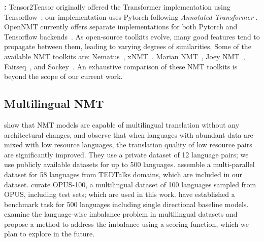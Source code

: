 \textbf{\rtg:}
Tensor2Tensor \cite{vaswani-etal-2018-tensor2tensor} originally offered the Transformer \cite{vaswani2017attention} implementation using Tensorflow~\cite{tensorflow2015-whitepaper}; 
our implementation uses Pytorch \cite{NEURIPS2019_Pytorch} following \textit{Annotated Transformer} \cite{rush-2018-annotated}.
OpenNMT currently offers separate implementations for both Pytorch and Tensorflow backends~\cite{klein-etal-2017-opennmt,klein-etal-2020-opennmt}.
As open-source toolkits evolve, many good features tend to propagate between them, leading to varying degrees of similarities. Some of the available NMT toolkits are:
Nematus~\cite{sennrich-etal-2017-nematus}, 
xNMT~\cite{neubig-etal-2018-xnmt}.
Marian NMT~\cite{junczys-dowmunt-etal-2018-marian-fast},
Joey NMT~\cite{kreutzer-etal-2019-joeynmt},
Fairseq~\cite{ott-etal-2019-fairseq}, and 
Sockey~\cite{hieber-etal-2020-sockeye}.
An exhaustive comparison of these NMT toolkits is beyond the scope of our current work.

\subsection{Multilingual NMT}
\citet{johnson-etal-2017-googleNMT} show that NMT models are capable of multilingual translation without any architectural changes, and observe that when languages with abundant data are mixed with low resource languages, the translation quality of low resource pairs are significantly improved. They use a private dataset of 12 language pairs; we use publicly available datasets for up to 500 languages. %
\citet{qi-etal-2018-pretrainemb} assemble a multi-parallel dataset for 58 languages from TEDTalks domains, which are included in our dataset. 
\citet{zhang-etal-2020-multiling-nmt} curate OPUS-100, a multilingual dataset of 100 languages sampled from OPUS, including test sets; which are used in this work.
\citet{tiedemann-2020-tatoeba} have established a benchmark task for 500 languages  including single directional baseline models.
\citet{wang-etal-2020-balancing} examine the language-wise imbalance problem in multilingual datasets and propose a method to address the imbalance using a scoring function, which we plan to explore in the future.



